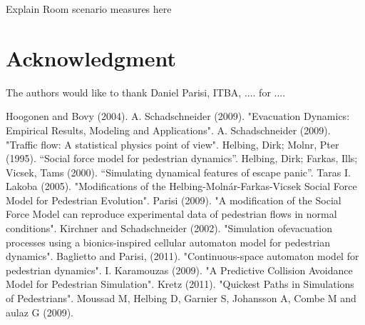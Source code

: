 \documentclass[draftclsnofoot]{IEEEtran}
\begin{document}
Explain Room scenario measures here

\section*{Acknowledgment}
The authors would like to thank Daniel Parisi, ITBA, .... for ....

\vfill

\begin{thebibliography}{1}

 Hoogonen and Bovy (2004).
 A. Schadschneider (2009). "Evacuation Dynamics: Empirical Results, Modeling and Applications".
 A. Schadschneider (2009). "Traffic flow: A statistical physics point of view".
 Helbing, Dirk; Molnr, Pter (1995). “Social force model for pedestrian dynamics”.
 Helbing, Dirk; Farkas, Ills; Vicsek, Tams (2000). “Simulating dynamical features of escape panic”.
 Taras I. Lakoba (2005). "Modifications of the Helbing-Molnár-Farkas-Vicsek Social Force Model for Pedestrian Evolution".
 Parisi (2009). "A modification of the Social Force Model can reproduce experimental data of pedestrian flows in normal conditions".
 Kirchner and Schadschneider (2002). "Simulation ofevacuation processes using a bionics-inspired cellular automaton model for pedestrian dynamics".
 Baglietto and Parisi, (2011). "Continuous-space automaton model for pedestrian dynamics".
 I. Karamouzas (2009). "A Predictive Collision Avoidance Model for Pedestrian Simulation".
 Kretz (2011). "Quickest Paths in Simulations of Pedestrians".
 Moussad M, Helbing D, Garnier S, Johansson A, Combe M and aulaz G (2009).


\end{thebibliography}
\end{document}
